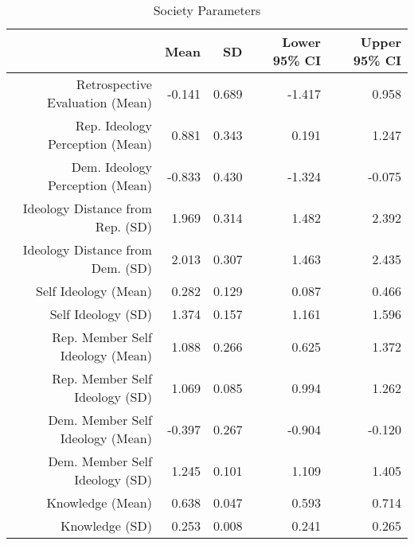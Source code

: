 \begin{table}[!ht]
\centering
\caption{Society Parameters} 
\label{socparams}
\begin{tabular}{rrrrr}
  \hline
 & Mean & SD & Lower 95\% CI & Upper 95\% CI \\ 
  \hline
Retrospective Evaluation (Mean) & -0.141 & 0.689 & -1.417 & 0.958 \\ 
  Rep. Ideology Perception (Mean) & 0.881 & 0.343 & 0.191 & 1.247 \\ 
  Dem. Ideology Perception (Mean) & -0.833 & 0.430 & -1.324 & -0.075 \\ 
  Ideology Distance from Rep. (SD) & 1.969 & 0.314 & 1.482 & 2.392 \\ 
  Ideology Distance from Dem. (SD) & 2.013 & 0.307 & 1.463 & 2.435 \\ 
  Self Ideology (Mean) & 0.282 & 0.129 & 0.087 & 0.466 \\ 
  Self Ideology (SD) & 1.374 & 0.157 & 1.161 & 1.596 \\ 
  Rep. Member Self Ideology (Mean) & 1.088 & 0.266 & 0.625 & 1.372 \\ 
  Rep. Member Self Ideology (SD) & 1.069 & 0.085 & 0.994 & 1.262 \\ 
  Dem. Member Self Ideology (Mean) & -0.397 & 0.267 & -0.904 & -0.120 \\ 
  Dem. Member Self Ideology (SD) & 1.245 & 0.101 & 1.109 & 1.405 \\ 
  Knowledge (Mean) & 0.638 & 0.047 & 0.593 & 0.714 \\ 
  Knowledge (SD) & 0.253 & 0.008 & 0.241 & 0.265 \\ 
   \hline
\end{tabular}
\end{table}
